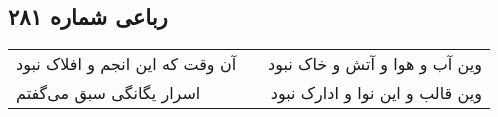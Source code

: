 \begin{center}
\section*{رباعی شماره ۲۸۱}
\label{sec:sh281}
\begin{longtable}{l p{0.5cm} r}
آن وقت که این انجم و افلاک نبود
&&
وین آب و هوا و آتش و خاک نبود
\\
اسرار یگانگی سبق می‌گفتم
&&
وین قالب و این نوا و ادارک نبود
\\
\end{longtable}
\end{center}
